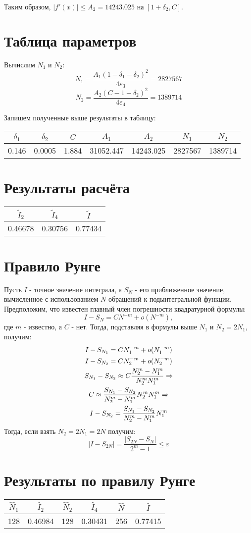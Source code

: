 \documentclass[titlepage]{article}
\def\l{\left}
\def\r{\right}
\def\le{\leqslant}
\begin{document}
Таким образом, $|f'(x)| \le A_2 = 14243.025$ на $[1+\delta_2, C]$.

\section{Таблица параметров}
Вычислим $N_1$ и $N_2$:
$$N_1 = \frac{A_1(1-\delta_1-\delta_2)^2}{4\varepsilon_3} = 2827567$$
$$N_2 = \frac{A_2(C-1-\delta_2)^2}{4\varepsilon_4} = 1389714$$

Запишем полученные выше результаты в таблицу:
\begin{center}
	\begin{tabular}{|c|c|c|c|c|c|c|}
		\hline
		$\delta_1$ & $\delta_2$ & $C$ & $A_1$ & $A_2$ & $N_1$ & $N_2$ \\
		\hline
		0.146 & 0.0005 & 1.884 & 31052.447 & 14243.025 & 2827567 & 1389714 \\
		\hline
	\end{tabular}
\end{center}

\section{Результаты расчёта}
\begin{center}
	\begin{tabular}{|c|c|c|}
		\hline
		$\tilde I_2$ & $\tilde I_4$ & $\tilde I$\\
		\hline
		0.46678 & 0.30756 & 0.77434 \\
		\hline
	\end{tabular}
\end{center}

\section{Правило Рунге}
Пусть $I$ - точное значение интеграла, а $S_N$ - его приближенное значение, вычисленное с использованием $N$ обращений к подынтегральной функции. Предположим, что известен главный член погрешности квадратурной формулы:
$$I - S_N = CN^{-m} + o(N^{-m}),$$
где $m$ - известно, а $C$ - нет. Тогда, подставляя в формулы выше $N_1$ и $N_2 = 2N_1$, получим:
\begin{gather}
	\notag I - S_{N_1} = CN_1^{-m} + o(N_1^{-m}) \\
	\notag I - S_{N_2} = CN_2^{-m} + o(N_2^{-m}) \\
	\notag S_{N_1} - S_{N_2} \approx C \frac{N_2^m - N_1^m}{N_2^m N_1^m} \Rightarrow \\
	\notag C \approx \frac{S_{N_1} - S_{N_2}}{N_2^m - N_1^m}N_2^m N_1^m \Rightarrow \\
	\notag I - S_{N_2} = \frac{S_{N_1} - S_{N_2}}{N_2^m - N_1^m}N_1^m
\end{gather}
Тогда, если взять $N_2 = 2N_1 = 2N$ получим:
$$\l| I - S_{2N} \r| = \frac{\l| S_{2N} - S_N \r|}{2^m - 1} \le \varepsilon$$

\section{Результаты по правилу Рунге}
\begin{center}
	\begin{tabular}{|c|c|c|c|c|c|}
		\hline
		$\hat N_1$ & $\hat I_2$ & $\hat N_2$ & $\hat I_4$ & $\hat N$ & $\hat I$ \\
		\hline
		128 & 0.46984 & 128 & 0.30431 & 256 & 0.77415 \\
		\hline
	\end{tabular}
\end{center}
\end{document}
